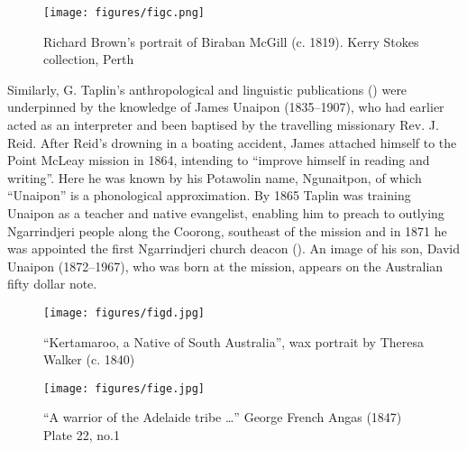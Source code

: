 \begin{figure}
\texttt{[image: figures/figc.png]}
\caption{Richard Brown’s portrait of Biraban McGill (c. 1819). Kerry Stokes collection, Perth}
\label{fig:key:1.1.3-3}
\end{figure} 

Similarly, G. Taplin’s anthropological and linguistic publications () were underpinned by the knowledge of James Unaipon (1835--1907), who had earlier acted as an interpreter and been baptised by the travelling missionary Rev. J. Reid. After Reid’s drowning in a boating accident, James attached himself to the Point McLeay mission in 1864, intending to “improve himself in reading and writing”. Here he was known by his Potawolin name, Ngunaitpon, of which “Unaipon” is a phonological approximation. By 1865 Taplin was training Unaipon as a teacher and native evangelist, enabling him to preach to outlying Ngarrindjeri people along the Coorong, southeast of the mission \citep[114]{Lane1997} and in 1871 he was appointed the first Ngarrindjeri church deacon (\citealt{Jones2005}). An image of his son, David Unaipon (1872--1967), who was born at the mission, appears on the Australian fifty dollar note. 

\begin{figure}[b]
\texttt{[image: figures/figd.jpg]}
\caption{“Kertamaroo, a Native of South Australia”, wax portrait by Theresa Walker (c. 1840)}
\label{fig:key:1.1.3-4}
\end{figure}

\begin{figure}[b]
\texttt{[image: figures/fige.jpg]}
\caption{“A warrior of the Adelaide tribe …” George French Angas (1847) Plate 22, no.1}
\label{fig:key:1.1.3-5}
\end{figure}


